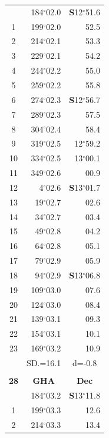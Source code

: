 \documentclass[10pt, a4paper]{report}
\begin{document}
\begin{scriptsize}
\begin{tabular*}{0.2\textwidth}[t]{@{\extracolsep{\fill}}|c|rr|}
\hline\rule{0pt}{2.6ex}\noindent
0 & 184$^\circ$02.0 & \textbf{S}12$^\circ$51.6\\
1 & 199$^\circ$02.0 & 52.5\\
2 & 214$^\circ$02.1 & 53.3\\
3 & 229$^\circ$02.1 & \raisebox{0.24ex}{\boldmath$\cdot$~\boldmath$\cdot$~~}54.2\\
4 & 244$^\circ$02.2 & 55.0\\
5 & 259$^\circ$02.2 & 55.8\\[2Pt]
6 & 274$^\circ$02.3 & \textbf{S}12$^\circ$56.7\\
7 & 289$^\circ$02.3 & 57.5\\
8 & 304$^\circ$02.4 & 58.4\\
9 & 319$^\circ$02.5 & 12$^\circ$59.2\\
10 & 334$^\circ$02.5 & 13$^\circ$00.1\\
11 & 349$^\circ$02.6 & 00.9\\[2Pt]
12 & 4$^\circ$02.6 & \textbf{S}13$^\circ$01.7\\
13 & 19$^\circ$02.7 & 02.6\\
14 & 34$^\circ$02.7 & 03.4\\
15 & 49$^\circ$02.8 & \raisebox{0.24ex}{\boldmath$\cdot$~\boldmath$\cdot$~~}04.2\\
16 & 64$^\circ$02.8 & 05.1\\
17 & 79$^\circ$02.9 & 05.9\\[2Pt]
18 & 94$^\circ$02.9 & \textbf{S}13$^\circ$06.8\\
19 & 109$^\circ$03.0 & 07.6\\
20 & 124$^\circ$03.0 & 08.4\\
21 & 139$^\circ$03.1 & \raisebox{0.24ex}{\boldmath$\cdot$~\boldmath$\cdot$~~}09.3\\
22 & 154$^\circ$03.1 & 10.1\\
23 & 169$^\circ$03.2 & 10.9\\
\hline
\rule{0pt}{2.4ex} & \multicolumn{1}{c}{SD.=16.1} & \multicolumn{1}{c|}{d=-0.8}\\
\hline
\multicolumn{1}{c}{}\\[-0.5ex]\hline
\multicolumn{1}{|c|}{\rule{0pt}{2.6ex}\textbf{28}} & \multicolumn{1}{c}{\textbf{GHA}} & \multicolumn{1}{c|}{\textbf{Dec}}\\
\hline\rule{0pt}{2.6ex}\noindent
0 & 184$^\circ$03.2 & \textbf{S}13$^\circ$11.8\\
1 & 199$^\circ$03.3 & 12.6\\
2 & 214$^\circ$03.3 & 13.4\\

\end{tabular*}
\end{scriptsize}
\end{document}
